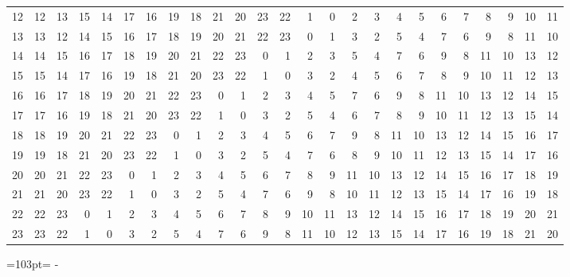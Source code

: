 \documentclass[10pt,a4paper]{article}
\newcommand{\needspace}[1]{\par\penalty-100\begingroup\dimen0=#1\relax\dimen2=\pagegoal
  \advance\dimen2-\pagetotal\ifdim\dimen0>\dimen2\relax\ifdim\dimen2>0pt\vfil\break\fi\fi
  \endgroup}
\numberwithin{equation}{section}
\begin{document}
{\begin{longtable}{@{}r|rrrrrrrrrrrrrrrrrrrrrrrr@{}}
12 & 12 & 13 & 15 & 14 & 17 & 16 & 19 & 18 & 21 & 20 & 23 & 22 & 1 & 0 & 2 & 3 & 4 & 5 & 6 & 7 & 8 & 9 & 10 & 11\\
13 & 13 & 12 & 14 & 15 & 16 & 17 & 18 & 19 & 20 & 21 & 22 & 23 & 0 & 1 & 3 & 2 & 5 & 4 & 7 & 6 & 9 & 8 & 11 & 10\\
14 & 14 & 15 & 16 & 17 & 18 & 19 & 20 & 21 & 22 & 23 & 0 & 1 & 2 & 3 & 5 & 4 & 7 & 6 & 9 & 8 & 11 & 10 & 13 & 12\\
15 & 15 & 14 & 17 & 16 & 19 & 18 & 21 & 20 & 23 & 22 & 1 & 0 & 3 & 2 & 4 & 5 & 6 & 7 & 8 & 9 & 10 & 11 & 12 & 13\\
16 & 16 & 17 & 18 & 19 & 20 & 21 & 22 & 23 & 0 & 1 & 2 & 3 & 4 & 5 & 7 & 6 & 9 & 8 & 11 & 10 & 13 & 12 & 14 & 15\\
17 & 17 & 16 & 19 & 18 & 21 & 20 & 23 & 22 & 1 & 0 & 3 & 2 & 5 & 4 & 6 & 7 & 8 & 9 & 10 & 11 & 12 & 13 & 15 & 14\\
18 & 18 & 19 & 20 & 21 & 22 & 23 & 0 & 1 & 2 & 3 & 4 & 5 & 6 & 7 & 9 & 8 & 11 & 10 & 13 & 12 & 14 & 15 & 16 & 17\\
19 & 19 & 18 & 21 & 20 & 23 & 22 & 1 & 0 & 3 & 2 & 5 & 4 & 7 & 6 & 8 & 9 & 10 & 11 & 12 & 13 & 15 & 14 & 17 & 16\\
20 & 20 & 21 & 22 & 23 & 0 & 1 & 2 & 3 & 4 & 5 & 6 & 7 & 8 & 9 & 11 & 10 & 13 & 12 & 14 & 15 & 16 & 17 & 18 & 19\\
21 & 21 & 20 & 23 & 22 & 1 & 0 & 3 & 2 & 5 & 4 & 7 & 6 & 9 & 8 & 10 & 11 & 12 & 13 & 15 & 14 & 17 & 16 & 19 & 18\\
22 & 22 & 23 & 0 & 1 & 2 & 3 & 4 & 5 & 6 & 7 & 8 & 9 & 10 & 11 & 13 & 12 & 14 & 15 & 16 & 17 & 18 & 19 & 20 & 21\\*
23 & 23 & 22 & 1 & 0 & 3 & 2 & 5 & 4 & 7 & 6 & 9 & 8 & 11 & 10 & 12 & 13 & 15 & 14 & 17 & 16 & 19 & 18 & 21 & 20\\
\bottomrule\end{longtable}}
\needspace{103pt}
\end{document}
